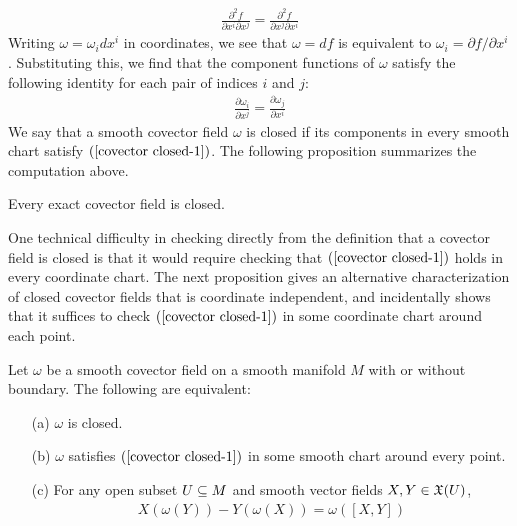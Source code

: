 \begin{align*}
\frac{\partial^2f}{\partial x^i\partial x^j}=\frac{\partial^2f}{\partial x^j\partial x^i}
\end{align*}
Writing $\omega=\omega_idx^i$ in coordinates, we see that $\omega=df$ is equivalent to $\omega_i=\partial f/\partial x^i$. Substituting this, we find that the component functions of $\omega$ satisfy the following identity for each pair of indices $i$ and $j$:
\begin{align}\label{covector closed-1}
\frac{\partial\omega_i}{\partial x^j}=\frac{\partial\omega_j}{\partial x^i}
\end{align}
We say that a smooth covector field $\omega$ is closed if its components in every smooth chart satisfy $(\ref{covector closed-1})$. The following proposition summarizes the computation above.
\begin{proposition}
Every exact covector field is closed.
\end{proposition}
One technical difficulty in checking directly from the definition that a covector field is closed is that it would require checking that $(\ref{covector closed-1})$ holds in every coordinate chart. The next proposition gives an alternative characterization of closed covector fields that is coordinate independent, and incidentally shows that it suffices to check $(\ref{covector closed-1})$ in some coordinate chart around each point.
\begin{proposition}\label{covector closed iff}
Let $\omega$ be a smooth covector field on a smooth manifold $M$ with or without boundary. The following are equivalent:
\begin{itemize}
\item[(a)] $\omega$ is closed.
\item[(b)] $\omega$ satisfies $(\ref{covector closed-1})$ in some smooth chart around every point.
\item[(c)] For any open subset $U\subseteq M$ and smooth vector fields $X,Y\in\mathfrak{X}(U)$,
\begin{align}\label{covector closed-2}
X(\omega(Y))-Y(\omega(X))=\omega([X,Y])
\end{align}
\end{itemize}
\end{proposition}
